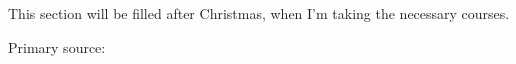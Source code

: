 This section will be filled after Christmas, when I'm taking the necessary courses.

Primary source: \cite[ch. 8]{lecture_notes}
